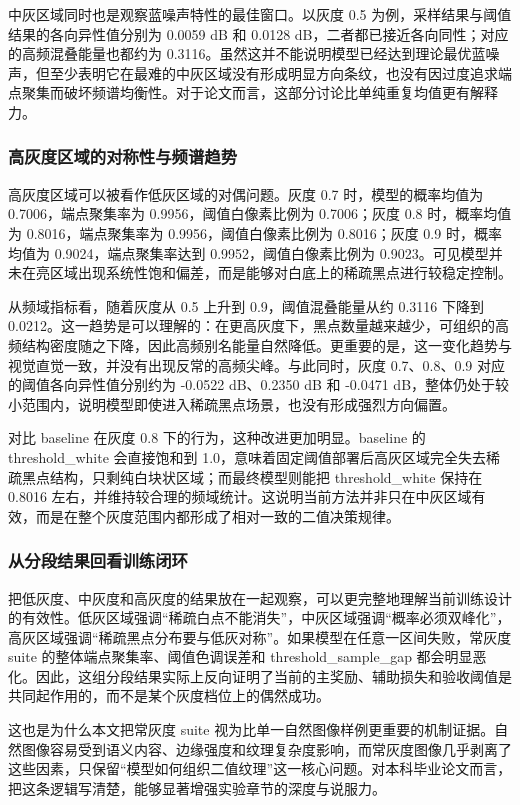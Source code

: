 \documentclass[thesis]{../zstucs-graduation-project}
\begin{document}
中灰区域同时也是观察蓝噪声特性的最佳窗口。以灰度 0.5 为例，采样结果与阈值结果的各向异性值分别为 0.0059 dB 和 0.0128 dB，二者都已接近各向同性；对应的高频混叠能量也都约为 0.3116。虽然这并不能说明模型已经达到理论最优蓝噪声，但至少表明它在最难的中灰区域没有形成明显方向条纹，也没有因过度追求端点聚集而破坏频谱均衡性。对于论文而言，这部分讨论比单纯重复均值更有解释力。

\subsubsection{高灰度区域的对称性与频谱趋势}
高灰度区域可以被看作低灰区域的对偶问题。灰度 0.7 时，模型的概率均值为 0.7006，端点聚集率为 0.9956，阈值白像素比例为 0.7006；灰度 0.8 时，概率均值为 0.8016，端点聚集率为 0.9956，阈值白像素比例为 0.8016；灰度 0.9 时，概率均值为 0.9024，端点聚集率达到 0.9952，阈值白像素比例为 0.9023。可见模型并未在亮区域出现系统性饱和偏差，而是能够对白底上的稀疏黑点进行较稳定控制。

从频域指标看，随着灰度从 0.5 上升到 0.9，阈值混叠能量从约 0.3116 下降到 0.0212。这一趋势是可以理解的：在更高灰度下，黑点数量越来越少，可组织的高频结构密度随之下降，因此高频别名能量自然降低。更重要的是，这一变化趋势与视觉直觉一致，并没有出现反常的高频尖峰。与此同时，灰度 0.7、0.8、0.9 对应的阈值各向异性值分别约为 -0.0522 dB、0.2350 dB 和 -0.0471 dB，整体仍处于较小范围内，说明模型即使进入稀疏黑点场景，也没有形成强烈方向偏置。

对比 baseline 在灰度 0.8 下的行为，这种改进更加明显。baseline 的 threshold\_white 会直接饱和到 1.0，意味着固定阈值部署后高灰区域完全失去稀疏黑点结构，只剩纯白块状区域；而最终模型则能把 threshold\_white 保持在 0.8016 左右，并维持较合理的频域统计。这说明当前方法并非只在中灰区域有效，而是在整个灰度范围内都形成了相对一致的二值决策规律。

\subsubsection{从分段结果回看训练闭环}
把低灰度、中灰度和高灰度的结果放在一起观察，可以更完整地理解当前训练设计的有效性。低灰区域强调“稀疏白点不能消失”，中灰区域强调“概率必须双峰化”，高灰区域强调“稀疏黑点分布要与低灰对称”。如果模型在任意一区间失败，常灰度 suite 的整体端点聚集率、阈值色调误差和 threshold\_sample\_gap 都会明显恶化。因此，这组分段结果实际上反向证明了当前的主奖励、辅助损失和验收阈值是共同起作用的，而不是某个灰度档位上的偶然成功。

这也是为什么本文把常灰度 suite 视为比单一自然图像样例更重要的机制证据。自然图像容易受到语义内容、边缘强度和纹理复杂度影响，而常灰度图像几乎剥离了这些因素，只保留“模型如何组织二值纹理”这一核心问题。对本科毕业论文而言，把这条逻辑写清楚，能够显著增强实验章节的深度与说服力。
\end{document}
